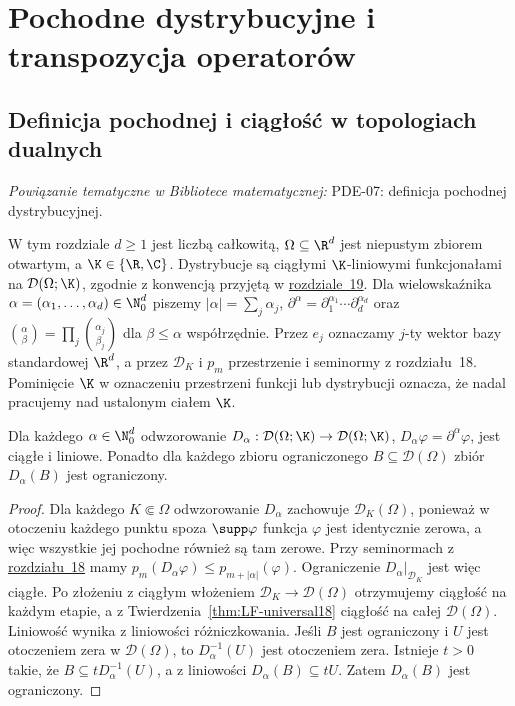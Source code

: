 \setcounter{section}{19}
\section{Pochodne dystrybucyjne i transpozycja operatorów}
\label{sec:pochodne20}

\providecommand{\atlasref}[2]{#2}


\subsection{Definicja pochodnej i ciągłość w topologiach dualnych}

\noindent\emph{Powiązanie tematyczne w Bibliotece matematycznej:} \atlasref{PDE-07::def:pde7-derivative}{PDE-07: definicja pochodnej dystrybucyjnej}.


W tym rozdziale $d\ge1$ jest liczbą całkowitą,
$\Omega\subseteq\R^d$ jest niepustym zbiorem otwartym,
a $\K\in\{\R,\C\}$. Dystrybucje są
ciągłymi $\K$-liniowymi funkcjonałami na $\mathcal D(\Omega;\K)$, zgodnie
z konwencją przyjętą w \hyperref[sec:dystrybucje19]{rozdziale~19}.
Dla wielowskaźnika $\alpha=(\alpha_1,\ldots,\alpha_d)\in\N_0^d$
piszemy $|\alpha|=\sum_j\alpha_j$,
$\partial^\alpha=\partial_1^{\alpha_1}\cdots\partial_d^{\alpha_d}$
oraz $\binom\alpha\beta=\prod_j\binom{\alpha_j}{\beta_j}$
dla $\beta\le\alpha$ współrzędnie. Przez $e_j$ oznaczamy
$j$-ty wektor bazy standardowej $\R^d$, a przez $\mathcal D_K$
i $p_m$ przestrzenie i seminormy z rozdziału~18.
Pominięcie $\K$ w oznaczeniu przestrzeni funkcji lub dystrybucji
oznacza, że nadal pracujemy nad ustalonym ciałem $\K$.

\begin{lemat}
\label{lem:test-derivative20}
Dla każdego $\alpha\in\N_0^d$ odwzorowanie
$D_\alpha:\mathcal D(\Omega;\K)\to\mathcal D(\Omega;\K)$,
$D_\alpha\varphi=\partial^\alpha\varphi$, jest ciągłe i liniowe.
Ponadto dla każdego zbioru ograniczonego $B\subseteq\mathcal D(\Omega)$
zbiór $D_\alpha(B)$ jest ograniczony.
\end{lemat}
\begin{proof}
Dla każdego $K\Subset\Omega$ odwzorowanie $D_\alpha$ zachowuje
$\mathcal D_K(\Omega)$, ponieważ w otoczeniu każdego punktu
spoza $\supp\varphi$ funkcja $\varphi$ jest identycznie zerowa,
a więc wszystkie jej pochodne również są tam zerowe.
Przy seminormach z \hyperref[sec:funkcje-testowe18]{rozdziału~18} mamy
$p_m(D_\alpha\varphi)\le p_{m+|\alpha|}(\varphi)$.
Ograniczenie $D_\alpha|_{\mathcal D_K}$ jest więc ciągłe.
Po złożeniu z ciągłym włożeniem $\mathcal D_K\to\mathcal D(\Omega)$
otrzymujemy ciągłość na każdym etapie, a z
Twierdzenia~\ref{thm:LF-universal18} ciągłość na całej $\mathcal D(\Omega)$.
Liniowość wynika z liniowości różniczkowania.
Jeśli $B$ jest ograniczony i $U$ jest otoczeniem zera
w $\mathcal D(\Omega)$, to $D_\alpha^{-1}(U)$ jest
otoczeniem zera. Istnieje $t>0$ takie, że
$B\subseteq tD_\alpha^{-1}(U)$, a z liniowości
$D_\alpha(B)\subseteq tU$. Zatem $D_\alpha(B)$ jest ograniczony.
\end{proof}

